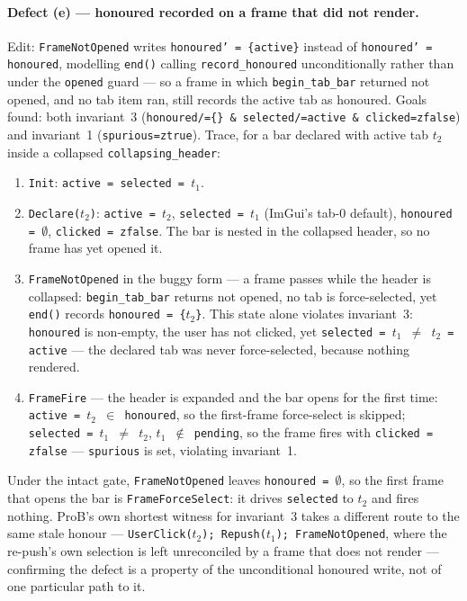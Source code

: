 \documentclass[a4paper,10pt,fleqn]{article}
\begin{document}
\paragraph{Defect (e) --- honoured recorded on a frame that did not render.}
Edit: \texttt{FrameNotOpened} writes \texttt{honoured' = \{active\}} instead of
\texttt{honoured' = honoured}, modelling \texttt{end()} calling
\texttt{record\_honoured} unconditionally rather than under the \texttt{opened}
guard --- so a frame in which \texttt{begin\_tab\_bar} returned not opened, and
no tab item ran, still records the active tab as honoured.  Goals found: both
invariant~3 (\texttt{honoured/=\{\} \& selected/=active \& clicked=zfalse}) and
invariant~1 (\texttt{spurious=ztrue}).  Trace, for a bar declared with active
tab $t_2$ inside a collapsed \texttt{collapsing\_header}:
\begin{enumerate}
  \item \texttt{Init}: \texttt{active = selected = $t_1$}.
  \item \texttt{Declare($t_2$)}: \texttt{active = $t_2$},
    \texttt{selected = $t_1$} (ImGui's tab-0 default), \texttt{honoured =
    $\emptyset$}, \texttt{clicked = zfalse}.  The bar is nested in the collapsed
    header, so no frame has yet opened it.
  \item \texttt{FrameNotOpened} in the buggy form --- a frame passes while the
    header is collapsed: \texttt{begin\_tab\_bar} returns not opened, no tab is
    force-selected, yet \texttt{end()} records \texttt{honoured = \{$t_2$\}}.
    This state alone violates invariant~3: \texttt{honoured} is non-empty, the
    user has not clicked, yet \texttt{selected = $t_1$ $\neq$ $t_2$ = active} ---
    the declared tab was never force-selected, because nothing rendered.
  \item \texttt{FrameFire} --- the header is expanded and the bar opens for the
    first time: \texttt{active = $t_2$ $\in$ honoured}, so the first-frame
    force-select is skipped; \texttt{selected = $t_1$ $\neq$ $t_2$},
    \texttt{$t_1$ $\notin$ pending}, so the frame fires with
    \texttt{clicked = zfalse} --- \texttt{spurious} is set, violating
    invariant~1.
\end{enumerate}
Under the intact gate, \texttt{FrameNotOpened} leaves \texttt{honoured =
$\emptyset$}, so the first frame that opens the bar is \texttt{FrameForceSelect}:
it drives \texttt{selected} to $t_2$ and fires nothing.  ProB's own shortest
witness for invariant~3 takes a different route to the same stale honour ---
\texttt{UserClick($t_2$); Repush($t_1$); FrameNotOpened}, where the re-push's
own selection is left unreconciled by a frame that does not render --- confirming
the defect is a property of the unconditional honoured write, not of one
particular path to it.
\end{document}
